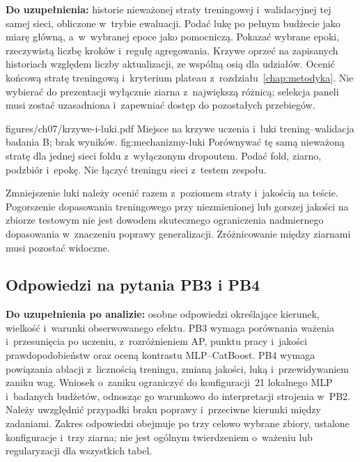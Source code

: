\textbf{Do uzupełnienia:} historie nieważonej straty treningowej i~walidacyjnej tej samej sieci, obliczone w~trybie ewaluacji. Podać lukę po pełnym budżecie jako miarę główną, a~w~wybranej epoce jako pomocniczą. Pokazać wybrane epoki, rzeczywistą liczbę kroków i~regułę agregowania. Krzywe oprzeć na zapisanych historiach względem liczby aktualizacji, ze wspólną osią dla udziałów. Ocenić końcową stratę treningową i~kryterium plateau z~rozdziału~\ref{chap:metodyka}. Nie wybierać do prezentacji wyłącznie ziarna z~największą różnicą; selekcja paneli musi zostać uzasadniona i~zapewniać dostęp do pozostałych przebiegów.

\plannedfigure
{figures/ch07/krzywe-i-luki.pdf}
{Miejsce na krzywe uczenia i~luki trening--walidacja badania B; brak wyników.}
{fig:mechanizmy-luki}
{Porównywać tę samą nieważoną stratę dla jednej sieci foldu z~wyłączonym dropoutem. Podać fold, ziarno, podzbiór i~epokę. Nie łączyć treningu sieci z~testem zespołu.}

Zmniejszenie luki należy ocenić razem z~poziomem straty i~jakością na teście. Pogorszenie dopasowania treningowego przy niezmienionej lub gorszej jakości na zbiorze testowym nie jest dowodem skutecznego ograniczenia nadmiernego dopasowania w~znaczeniu poprawy generalizacji. Zróżnicowanie między ziarnami musi pozostać widoczne.

\subsection{Odpowiedzi na pytania PB3 i PB4}
\label{sec:mechanizmy-odpowiedzi}

\textbf{Do uzupełnienia po analizie:} osobne odpowiedzi określające kierunek, wielkość i~warunki obserwowanego efektu. PB3 wymaga porównania ważenia i~przesunięcia po uczeniu, z~rozróżnieniem AP, punktu pracy i~jakości prawdopodobieństw oraz oceną kontrastu MLP--CatBoost. PB4 wymaga powiązania ablacji z~licznością treningu, zmianą jakości, luką i~przewidywaniem zaniku wag. Wniosek o~zaniku ograniczyć do konfiguracji~21 lokalnego MLP i~badanych budżetów, odnosząc go warunkowo do interpretacji strojenia w~PB2. Należy uwzględnić przypadki braku poprawy i~przeciwne kierunki między zadaniami. Zakres odpowiedzi obejmuje po trzy celowo wybrane zbiory, ustalone konfiguracje i~trzy ziarna; nie jest ogólnym twierdzeniem o~ważeniu lub regularyzacji dla wszystkich tabel.
